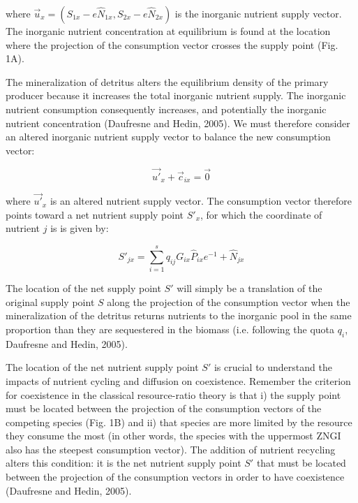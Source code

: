 \documentclass[letterpaper,twocolumn,showkeys]{revtex4-1}
\begin{document}
where $\overrightarrow{u}_{x}=(S_{1x}-e\widehat{N}_{1x},S_{2x}-e\widehat{N}_{2x})$ is the inorganic nutrient supply vector. The inorganic nutrient concentration at equilibrium is found at the location where the projection of the consumption vector crosses the supply point (Fig. 1A). 

	The mineralization of detritus alters the equilibrium density of the primary producer because it increases the total inorganic nutrient supply. The inorganic nutrient consumption consequently increases, and potentially the inorganic nutrient concentration (Daufresne and Hedin, 2005). We must therefore consider an altered inorganic nutrient supply vector to balance the new consumption vector:

\begin{equation}
	\label{e:bnet}
	\overrightarrow{u'}_{x}+\overrightarrow{c}_{ix}=\overrightarrow{0}
\end{equation}

where $\overrightarrow{u'}_{x}$ is an altered nutrient supply vector. The consumption vector therefore points toward a net nutrient supply point $S'_{x}$, for which the coordinate of nutrient $j$ is is given by:

\begin{equation}
	\label{e:bnet}
	S'_{jx}=\sum_{i=1}^{s}q_{ij}G_{ix}\widehat{P}_{ix}e^{-1}+\widehat{N}_{jx}
\end{equation}

The location of the net supply point $S'$ will simply be a translation of the original supply point $S$ along the projection of the consumption vector when the mineralization of the detritus returns nutrients to the inorganic pool in the same proportion than they are sequestered in the biomass (i.e. following the quota $q_{i}$, Daufresne and Hedin, 2005). 

	The location of the net nutrient supply point $S'$ is crucial to understand the impacts of nutrient cycling and diffusion on coexistence. Remember the criterion for coexistence in the classical resource-ratio theory is that i) the supply point must be located between the projection of the consumption vectors of the competing species (Fig. 1B) and ii) that species are more limited by the resource they consume the most (in other words, the species with the uppermost ZNGI also has the steepest consumption vector). The addition of nutrient recycling alters this condition: it is the net nutrient supply point $S'$ that must be located between the projection of the consumption vectors in order to have coexistence (Daufresne and Hedin, 2005). 
\end{document}
